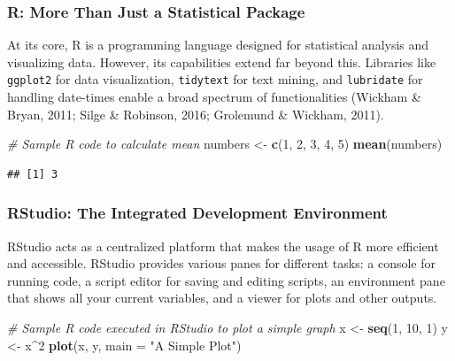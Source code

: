 \documentclass[
  b5paper]{book}
\newenvironment{Shaded}{\begin{snugshade}}{\end{snugshade}}
\newcommand{\AttributeTok}[1]{\textcolor[rgb]{0.13,0.29,0.53}{#1}}
\newcommand{\CommentTok}[1]{\textcolor[rgb]{0.56,0.35,0.01}{\textit{#1}}}
\newcommand{\DecValTok}[1]{\textcolor[rgb]{0.00,0.00,0.81}{#1}}
\newcommand{\FunctionTok}[1]{\textcolor[rgb]{0.13,0.29,0.53}{\textbf{#1}}}
\newcommand{\NormalTok}[1]{#1}
\newcommand{\OtherTok}[1]{\textcolor[rgb]{0.56,0.35,0.01}{#1}}
\newcommand{\SpecialCharTok}[1]{\textcolor[rgb]{0.81,0.36,0.00}{\textbf{#1}}}
\newcommand{\StringTok}[1]{\textcolor[rgb]{0.31,0.60,0.02}{#1}}
\begin{document}
\hypertarget{r-more-than-just-a-statistical-package}{%
\subsubsection*{R: More Than Just a Statistical Package}\label{r-more-than-just-a-statistical-package}}

At its core, R is a programming language designed for statistical analysis and visualizing data. However, its capabilities extend far beyond this. Libraries like \texttt{ggplot2} for data visualization, \texttt{tidytext} for text mining, and \texttt{lubridate} for handling date-times enable a broad spectrum of functionalities (Wickham \& Bryan, 2011; Silge \& Robinson, 2016; Grolemund \& Wickham, 2011).

\begin{Shaded}
\begin{Highlighting}[]
\CommentTok{\# Sample R code to calculate mean}
\NormalTok{numbers }\OtherTok{\textless{}{-}} \FunctionTok{c}\NormalTok{(}\DecValTok{1}\NormalTok{, }\DecValTok{2}\NormalTok{, }\DecValTok{3}\NormalTok{, }\DecValTok{4}\NormalTok{, }\DecValTok{5}\NormalTok{)}
\FunctionTok{mean}\NormalTok{(numbers)}
\end{Highlighting}
\end{Shaded}

\begin{verbatim}
## [1] 3
\end{verbatim}

\hypertarget{rstudio-the-integrated-development-environment}{%
\subsubsection*{RStudio: The Integrated Development Environment}\label{rstudio-the-integrated-development-environment}}

RStudio acts as a centralized platform that makes the usage of R more efficient and accessible. RStudio provides various panes for different tasks: a console for running code, a script editor for saving and editing scripts, an environment pane that shows all your current variables, and a viewer for plots and other outputs.

\begin{Shaded}
\begin{Highlighting}[]
\CommentTok{\# Sample R code executed in RStudio to plot a simple graph}
\NormalTok{x }\OtherTok{\textless{}{-}} \FunctionTok{seq}\NormalTok{(}\DecValTok{1}\NormalTok{, }\DecValTok{10}\NormalTok{, }\DecValTok{1}\NormalTok{)}
\NormalTok{y }\OtherTok{\textless{}{-}}\NormalTok{ x}\SpecialCharTok{\^{}}\DecValTok{2}
\FunctionTok{plot}\NormalTok{(x, y, }\AttributeTok{main =} \StringTok{"A Simple Plot"}\NormalTok{)}
\end{Highlighting}
\end{Shaded}
\end{document}
